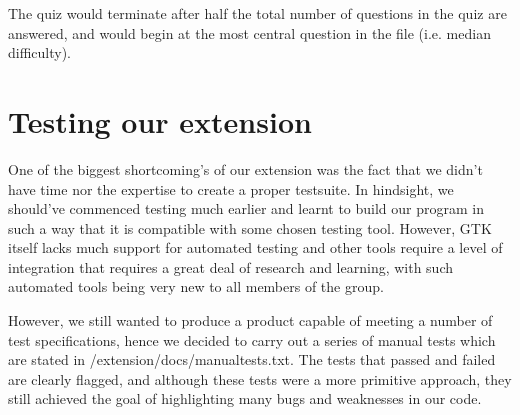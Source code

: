 \documentclass{article}
\begin{document}

\vspace{5mm} %

The quiz would terminate after half the total number of questions in the quiz are answered, and would begin at the most central question in the file (i.e. median difficulty).

\section{Testing our extension}
One of the biggest shortcoming's of our extension was the fact that we didn't have time nor the expertise to create a proper testsuite. In hindsight, we should've commenced testing much earlier and learnt to build our program in such a way that it is compatible with some chosen testing tool. However, GTK itself lacks much support for automated testing and other tools require a level of integration that requires a great deal of research and learning, with such automated tools being very new to all members of the group.

However, we still wanted to produce a product capable of meeting a number of test specifications, hence we decided to carry out a series of manual tests which are stated in /extension/docs/manualtests.txt. The tests that passed and failed are clearly flagged, and although these tests were a more primitive approach, they still achieved the goal of highlighting many bugs and weaknesses in our code.
\end{document}

